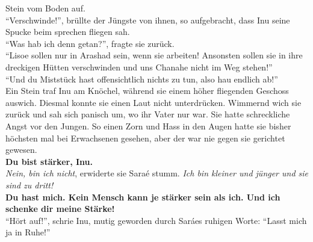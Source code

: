 Stein vom Boden auf. \\
``Verschwinde!'', brüllte der Jüngste von ihnen, so aufgebracht, dass Inu seine Spucke beim 
sprechen fliegen sah.\\
``Was hab ich denn getan?'', fragte sie zurück.\\
``Lisoe sollen nur in Arashad sein, wenn sie arbeiten! Ansonsten sollen sie in ihre dreckigen 
Hütten verschwinden und uns Chanahe nicht im Weg stehen!''\\
``Und du Miststück hast offensichtlich nichts zu tun, also hau endlich ab!''\\
Ein Stein traf Inu am Knöchel, während sie einem höher fliegenden Geschoss auswich. Diesmal konnte 
sie einen Laut nicht unterdrücken. Wimmernd wich sie zurück und sah sich panisch um, wo ihr Vater 
nur war. Sie hatte schreckliche Angst vor den Jungen. So einen Zorn und Hass in den Augen hatte sie 
bisher höchsten mal bei Erwachsenen gesehen, aber der war nie gegen sie gerichtet gewesen.\\
\textbf{Du bist stärker, Inu.}\\
\textit{Nein, bin ich nicht}, erwiderte sie Saraé stumm. \textit{Ich bin kleiner und jünger und sie 
sind zu dritt!}\\
\textbf{Du hast mich. Kein Mensch kann je stärker sein als ich. Und ich schenke dir meine Stärke!}\\
``Hört auf!'', schrie Inu, mutig geworden durch Saráes ruhigen Worte: ``Lasst mich ja in Ruhe!''\\


